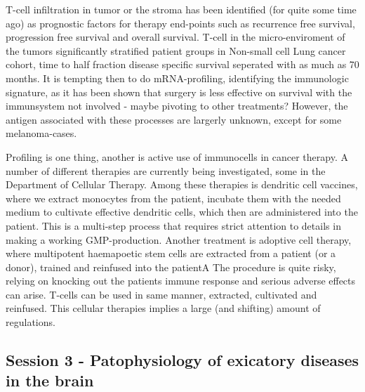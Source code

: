 \documentclass[12p]{article}
\begin{document}
T-cell infiltration in tumor or the stroma has been identified (for quite some time ago) as prognostic factors for therapy end-points such as recurrence free survival, progression free survival and overall survival.
T-cell in the micro-enviroment of the tumors significantly stratified patient groups in Non-small cell Lung cancer cohort, time to half fraction disease specific survival seperated with as much as 70 months.
It is tempting then to do mRNA-profiling, identifying the immunologic signature, as it has been shown that surgery is less effective on survival with the immunsystem not involved - maybe pivoting to other treatments?
However, the antigen associated with these processes are largerly unknown, except for some melanoma-cases.

Profiling is one thing, another is active use of immunocells in cancer therapy.
A number of different therapies are currently being investigated, some in the Department of Cellular Therapy.
Among these therapies is dendritic cell vaccines, where we extract monocytes from the patient, incubate them with the needed medium to cultivate effective dendritic cells, which then are administered into the patient.
This is a multi-step process that requires strict attention to details in making a working GMP-production.
Another treatment is adoptive cell therapy, where multipotent haemapoetic stem cells are extracted from a patient (or a donor), trained and reinfused into the patientA
The procedure is quite risky, relying on knocking out the patients immune response and serious adverse effects can arise.
T-cells can be used in same manner, extracted, cultivated and reinfused.
This cellular therapies implies a large (and shifting) amount of regulations.

\subsection*{Session 3 - Patophysiology of exicatory diseases in the brain}
\end{document}
